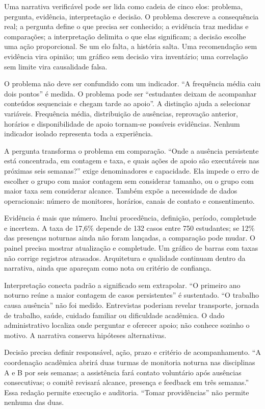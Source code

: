 Uma narrativa verificável pode ser lida como cadeia de cinco elos: problema, pergunta, evidência, interpretação e decisão. O problema descreve a consequência real; a pergunta define o que precisa ser conhecido; a evidência traz medidas e comparações; a interpretação delimita o que elas significam; a decisão escolhe uma ação proporcional. Se um elo falta, a história salta. Uma recomendação sem evidência vira opinião; um gráfico sem decisão vira inventário; uma correlação sem limite vira causalidade falsa.

O problema não deve ser confundido com um indicador. ``A frequência média caiu dois pontos'' é medida. O problema pode ser ``estudantes deixam de acompanhar conteúdos sequenciais e chegam tarde ao apoio''. A distinção ajuda a selecionar variáveis. Frequência média, distribuição de ausências, reprovação anterior, horários e disponibilidade de apoio tornam-se possíveis evidências. Nenhum indicador isolado representa toda a experiência.

A pergunta transforma o problema em comparação. ``Onde a ausência persistente está concentrada, em contagem e taxa, e quais ações de apoio são executáveis nas próximas seis semanas?'' exige denominadores e capacidade. Ela impede o erro de escolher o grupo com maior contagem sem considerar tamanho, ou o grupo com maior taxa sem considerar alcance. Também expõe a necessidade de dados operacionais: número de monitores, horários, canais de contato e consentimento.

Evidência é mais que número. Inclui procedência, definição, período, completude e incerteza. A taxa de 17,6\% depende de 132 casos entre 750 estudantes; se 12\% das presenças noturnas ainda não foram lançadas, a comparação pode mudar. O painel precisa mostrar atualização e completude. Um gráfico de barras com taxas não corrige registros atrasados. Arquitetura e qualidade continuam dentro da narrativa, ainda que apareçam como nota ou critério de confiança.

Interpretação conecta padrão a significado sem extrapolar. ``O primeiro ano noturno reúne a maior contagem de casos persistentes'' é sustentado. ``O trabalho causa ausência'' não foi medido. Entrevistas poderiam revelar transporte, jornada de trabalho, saúde, cuidado familiar ou dificuldade acadêmica. O dado administrativo localiza onde perguntar e oferecer apoio; não conhece sozinho o motivo. A narrativa conserva hipóteses alternativas.

Decisão precisa definir responsável, ação, prazo e critério de acompanhamento. ``A coordenação acadêmica abrirá duas turmas de monitoria noturna nas disciplinas A e B por seis semanas; a assistência fará contato voluntário após ausências consecutivas; o comitê revisará alcance, presença e feedback em três semanas.'' Essa redação permite execução e auditoria. ``Tomar providências'' não permite nenhuma das duas.


